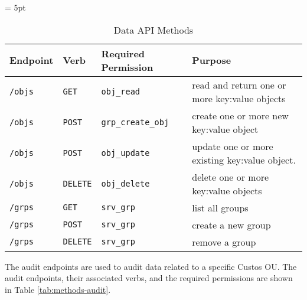 \begin{table}[!tb]
  \vspace{1ex}
  \begin{center}
    \tabulinesep = 5pt
    \begin{tabu} to \textwidth
      { | X[1,l,m]
        | X[.5,l,m]
        | X[1,l,m]
        | X[2,l,m]
        | }
      \hline
      \textbf{Endpoint}
      & \textbf{Verb}
      & \textbf{Required Permission}
      & \textbf{Purpose}
      \\ \hline
      \texttt{/objs} & \texttt{GET} & \texttt{obj\_read}
      & read and return one or more key:value objects
      \\ \hline
      \texttt{/objs} & \texttt{POST} & \texttt{grp\_create\_obj}
      & create one or more new key:value object
      \\ \hline
      \texttt{/objs} & \texttt{POST} & \texttt{obj\_update}
      & update one or more existing key:value object.
      \\ \hline
      \texttt{/objs} & \texttt{DELETE} & \texttt{obj\_delete}
      & delete one or more key:value objects
      \\ \hline
      \texttt{/grps} & \texttt{GET} & \texttt{srv\_grp}
      & list all groups
      \\ \hline
      \texttt{/grps} & \texttt{POST} & \texttt{srv\_grp}
      & create a new group
      \\ \hline
      \texttt{/grps} & \texttt{DELETE} & \texttt{srv\_grp}
      & remove a group
      \\ \hline
    \end{tabu}
  \end{center}
  \caption{Data API Methods}
  \label{tab:methods-data}
\end{table}

The audit endpoints are used to audit data related to a specific
Custos OU. The audit endpoints, their associated verbs, and the
required permissions are shown in Table \ref{tab:methods-audit}.

